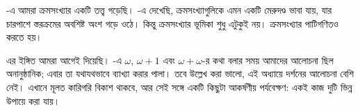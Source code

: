 \documentclass[../../../include/open-logic-section]{subfiles}
\begin{document}


-এ আমরা ক্রমসংখ্যার একটি তত্ত্ব গড়েছি।
-এ দেখেছি, ক্রমসংখ্যাগুলিকে এমন একটি
মেরুদণ্ড ভাবা যায়, যার চারপাশে স্তরক্রমের অবশিষ্ট অংশ গড়ে ওঠে।
কিন্তু ক্রমসংখ্যার ভূমিকা শুধু এটুকুই নয়।
ক্রমসংখ্যার পাটিগণিতও করতে হয়।

এর ইঙ্গিত আমরা আগেই দিয়েছি।
-এ $\omega$,
$\omega+1$ এবং $\omega+\omega$-র কথা বলার সময়
আমাদের আলোচনা ছিল অনানুষ্ঠানিক; এবার তা যথাযথভাবে
ব্যাখ্যা করার পালা। তবে উল্লেখ করা ভালো, এই অধ্যায়ে
দর্শনের আলোচনা বেশি নেই। এখানে মূলত কারিগরি বিকাশ
থাকবে, আর সেই সঙ্গে একটি কিছুটা আকর্ষণীয় পর্যবেক্ষণ:
একই কাজ দুটি ভিন্ন উপায়ে করা যায়।
\end{document}
